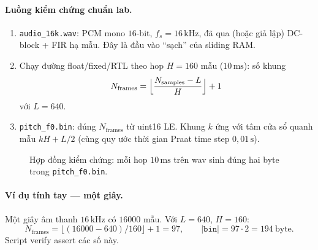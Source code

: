 \paragraph{Luồng kiểm chứng chuẩn lab.}
\begin{enumerate}[leftmargin=1.4em]
    \item \texttt{audio\_16k.wav}: PCM mono $16$-bit, $f_s=16\,\text{kHz}$, đã qua (hoặc giả lập) DC-block + FIR hạ mẫu. Đây là đầu vào ``sạch'' của sliding RAM.
    \item Chạy đường float/fixed/RTL theo hop $H=160$ mẫu ($10\,\text{ms}$): số khung
    \[
    N_{\mathrm{frames}}=\Bigl\lfloor\frac{N_{\mathrm{samples}}-L}{H}\Bigr\rfloor+1
    \]
    với $L=640$.
    \item \texttt{pitch\_f0.bin}: đúng $N_{\mathrm{frames}}$ từ uint16 LE. Khung $k$ ứng với tâm cửa sổ quanh mẫu $kH + L/2$ (cùng quy ước thời gian Praat time step $0{,}01\,\text{s}$).
\end{enumerate}

\begin{figure}[H]
\centering
{}
\caption{Hợp đồng kiểm chứng: mỗi hop $10\,\text{ms}$ trên wav sinh đúng hai byte trong \texttt{pitch\_f0.bin}.}
\label{fig:ch12_wav_bin}
\end{figure}

\paragraph{Ví dụ tính tay --- một giây.} Một giây âm thanh $16\,\text{kHz}$ có $16000$ mẫu. Với $L=640$, $H=160$:
\[
N_{\mathrm{frames}}=\bigl\lfloor(16000-640)/160\bigr\rfloor+1=97,\qquad
|\texttt{bin}|=97\cdot 2=194\ \text{byte}.
\]
Script verify assert các số này.

